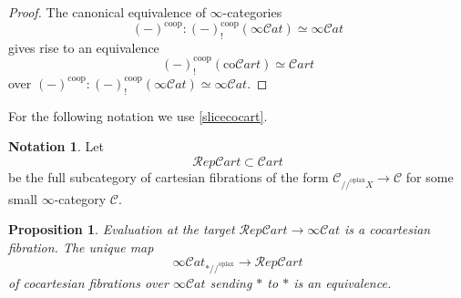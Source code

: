 \documentclass[10pt,oneside]{article}
\numberwithin{equation}{section} %
\numberwithin{figure}{section} %
\theoremstyle{plain}
\newtheorem{proposition}[theorem]{Proposition}
\theoremstyle{definition}
\newtheorem{notation}[theorem]{Notation}
\newcommand{\mC}{{\mathcal C}}
\newcommand{\co}{\mathrm{co}}
\newcommand{\oplax}{{\mathrm{oplax}}}
\newcommand{\coop}{\mathrm{coop}}
\newcommand{\scat}{\mathcal{C}\mathit{at}}
\begin{document}
\begin{proof}

The canonical equivalence of $\infty$-categories $$ (-)^{\coop} : (-)^{\coop}_!(\infty\scat) \simeq \infty\scat$$
gives rise to an equivalence
$$ (-)^{\coop}_!(\co\mathcal{C}\mathit{art}) \simeq \mathcal{C}\mathit{art}$$
over $ (-)^{\coop} : (-)^{\coop}_!(\infty\scat) \simeq \infty\scat.$
\end{proof}

For the following notation we use \cref{slicecocart}.
\begin{notation}

Let $$\mathcal{R}\mathit{ep}\mathcal{C}\mathit{art} \subset \mathcal{C}\mathit{art}$$ be the full subcategory of cartesian fibrations of the form
$\mC_{//^\oplax X} \to \mC $ for some small $\infty$-category $\mC.$

\end{notation}

\begin{proposition}\label{univ2}
Evaluation at the target $\mathcal{R}\mathit{ep}\mathcal{C}\mathit{art} \to \infty\scat$
is a cocartesian fibration.
The unique map $$ \infty\scat_{*//^\oplax} \to \mathcal{R}\mathit{ep}\mathcal{C}\mathit{art} $$
of cocartesian fibrations over $ \infty\scat$ sending $* $ to $*$ is an equivalence.

\end{proposition}
\end{document}
